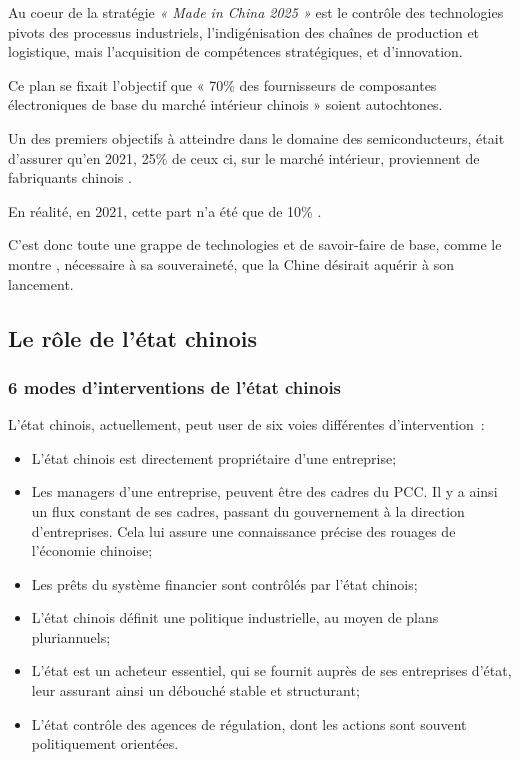 \documentclass[a4paper]{article}
\begin{document}
Au coeur de la stratégie \textit{« Made in China 2025 »} est le contrôle des technologies pivots des processus industriels, l’indigénisation des chaînes de production et logistique, mais l’acquisition de compétences stratégiques, et d’innovation.

Ce plan se fixait l’objectif que « 70\% des fournisseurs de composantes électroniques de base du marché intérieur chinois » soient autochtones.

Un des premiers objectifs à atteindre dans le domaine des semiconducteurs, était d’assurer qu’en 2021, 25\% de ceux ci, sur le marché intérieur, proviennent de fabriquants chinois \cite{Made_In_China_2025}.

En réalité, en 2021, cette part n’a été que de 10\% \cite{Futur_China_Semiconductor}.

C’est donc toute une grappe de technologies et de savoir-faire de base, comme le montre \cite{Made_In_China_2025}, nécessaire à sa souveraineté, que la Chine désirait aquérir à son lancement.

\subsection{Le rôle de l’état chinois}
\label{sec:org30c6878}
\subsubsection{6 modes d’interventions de l’état chinois}
\label{sec:orgecd012a}
L’état chinois, actuellement, peut user de six voies différentes d’intervention~:
\begin{itemize}
\item L’état chinois est directement propriétaire d’une entreprise;
\item Les managers d’une entreprise, peuvent être des cadres du PCC. Il y a ainsi un
flux constant de ses cadres, passant du gouvernement à la direction
d’entreprises. Cela lui assure une connaissance précise des rouages de
l’économie chinoise;
\item Les prêts du système financier sont contrôlés par l’état chinois;
\item L’état chinois définit une politique industrielle, au moyen de plans pluriannuels;
\item L’état est un acheteur essentiel, qui se fournit auprès de ses entreprises
d’état, leur assurant ainsi un débouché stable et structurant;
\item L’état contrôle des agences de régulation, dont les actions sont souvent
politiquement orientées.
\end{itemize}
\end{document}
